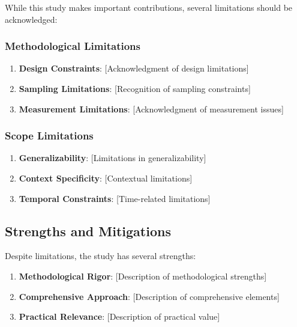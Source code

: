 \documentclass[
  12pt,
  letterpaper,
  12pt,
  letterpaper,
  oneside]{report}
\providecommand{\tightlist}{%
  \setlength{\itemsep}{0pt}\setlength{\parskip}{0pt}}
\begin{document}
While this study makes important contributions, several limitations
should be acknowledged:

\subsubsection{Methodological
Limitations}\label{methodological-limitations-2}

\begin{enumerate}
\def\labelenumi{\arabic{enumi}.}
\tightlist
\item
  \textbf{Design Constraints}: {[}Acknowledgment of design
  limitations{]}
\item
  \textbf{Sampling Limitations}: {[}Recognition of sampling
  constraints{]}
\item
  \textbf{Measurement Limitations}: {[}Acknowledgment of measurement
  issues{]}
\end{enumerate}

\subsubsection{Scope Limitations}\label{scope-limitations-1}

\begin{enumerate}
\def\labelenumi{\arabic{enumi}.}
\tightlist
\item
  \textbf{Generalizability}: {[}Limitations in generalizability{]}
\item
  \textbf{Context Specificity}: {[}Contextual limitations{]}
\item
  \textbf{Temporal Constraints}: {[}Time-related limitations{]}
\end{enumerate}

\subsection{Strengths and Mitigations}\label{strengths-and-mitigations}

Despite limitations, the study has several strengths:

\begin{enumerate}
\def\labelenumi{\arabic{enumi}.}
\tightlist
\item
  \textbf{Methodological Rigor}: {[}Description of methodological
  strengths{]}
\item
  \textbf{Comprehensive Approach}: {[}Description of comprehensive
  elements{]}
\item
  \textbf{Practical Relevance}: {[}Description of practical value{]}
\end{enumerate}
\end{document}
